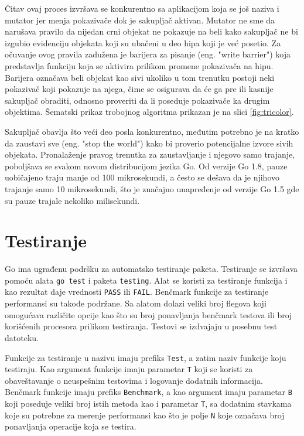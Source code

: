 \documentclass[12pt,oneside]{memoir}
\begin{document}
Čitav ovaj proces izvršava se konkurentno sa aplikacijom koja se još naziva i mutator jer menja pokazivače dok je sakupljač aktivan. Mutator ne sme da narušava pravilo da nijedan crni objekat ne pokazuje na beli kako sakupljač ne bi izgubio evidenciju objekata koji su ubačeni u deo hipa koji je već posetio. Za očuvanje ovog pravila zadužena je barijera za pisanje (eng. "write barrier") koja predstavlja funkciju koja se aktivira prilikom promene pokazivača na hipu. Barijera označava beli objekat kao sivi ukoliko u tom trenutku postoji neki pokazivač koji pokazuje na njega, čime se osigurava da će ga pre ili kasnije sakupljač obraditi, odnosno proveriti da li poseduje pokazivače ka drugim objektima. Šematski prikaz trobojnog algoritma prikazan je na slici \ref{fig:tricolor}.

Sakupljač obavlja što veći deo posla konkurentno, međutim potrebno je na kratko da zaustavi sve (eng. "stop the world") kako bi proverio potencijalne izvore sivih objekata. Pronalaženje pravog trenutka za zaustavljanje i njegovo samo trajanje, poboljšava se svakom novom distribucijom jezika Go. Od verzije Go 1.8, pauze uobičajeno traju manje od 100 mikrosekundi, a često se dešava da je njihovo trajanje samo 10 mikrosekundi, što je značajno unapređenje od verzije Go 1.5 gde su pauze trajale nekoliko milisekundi.

\section{Testiranje}

Go ima ugrađenu podršku za automatsko testiranje paketa. Testiranje se izvršava pomoću alata \texttt{go test} i paketa \texttt{testing}. Alat se koristi za testiranje funkcija i kao rezultat daje vrednosti \texttt{PASS} ili \texttt{FAIL}. Benčmark funkcije za testiranje performansi su takođe podržane. Sa alatom dolazi veliki broj flegova koji omogućava različite opcije kao što su broj ponavljanja benčmark testova ili broj korišćenih procesora prilikom testiranja. Testovi se izdvajaju u posebnu test datoteku. 

Funkcije za testiranje u nazivu imaju prefiks \texttt{Test}, a zatim naziv funkcije koju testiraju. Kao argument funkcije imaju parametar \texttt{T} koji se koristi za obaveštavanje o neuspešnim testovima i logovanje dodatnih informacija. Benčmark funkcije imaju prefiks \texttt{Benchmark}, a kao argument imaju parametar \texttt{B} koji poseduje veliki broj istih metoda kao i parametar \texttt{T}, sa dodatnim stavkama koje su potrebne za merenje performansi kao što je polje \texttt{N} koje označava broj ponavljanja operacije koja se testira.
\end{document}
